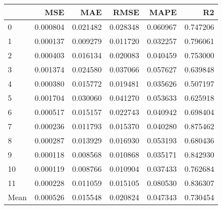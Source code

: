 \begin{tabular}{lrrrrr}
\toprule
 & MSE & MAE & RMSE & MAPE & R2 \\
\midrule
0 & 0.000804 & 0.021482 & 0.028348 & 0.060967 & 0.747206 \\
1 & 0.000137 & 0.009279 & 0.011720 & 0.032257 & 0.796061 \\
2 & 0.000403 & 0.016134 & 0.020083 & 0.040459 & 0.753000 \\
3 & 0.001374 & 0.024580 & 0.037066 & 0.057627 & 0.639848 \\
4 & 0.000380 & 0.015772 & 0.019481 & 0.035626 & 0.507197 \\
5 & 0.001704 & 0.030060 & 0.041270 & 0.053633 & 0.625918 \\
6 & 0.000517 & 0.015157 & 0.022743 & 0.040942 & 0.698404 \\
7 & 0.000236 & 0.011793 & 0.015370 & 0.040280 & 0.875462 \\
8 & 0.000287 & 0.013929 & 0.016930 & 0.053193 & 0.680436 \\
9 & 0.000118 & 0.008568 & 0.010868 & 0.035171 & 0.842930 \\
10 & 0.000119 & 0.008766 & 0.010904 & 0.037433 & 0.762684 \\
11 & 0.000228 & 0.011059 & 0.015105 & 0.080530 & 0.836307 \\
Mean & 0.000526 & 0.015548 & 0.020824 & 0.047343 & 0.730454 \\
\bottomrule
\end{tabular}
